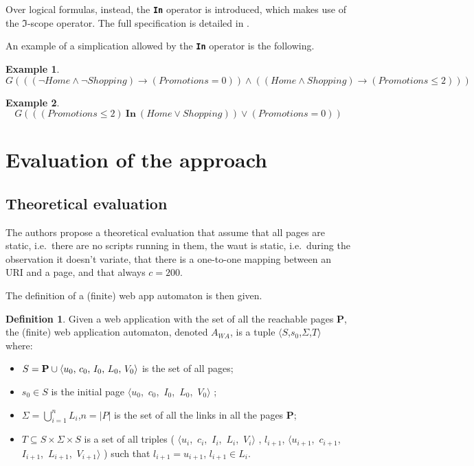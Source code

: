 \documentclass[a4paper,10pt]{article}
\newcommand{\tuple}[1]{\mbox{$\langle$#1$\rangle$}}
\newcommand{\res}[1][]{
  \ifthenelse{\equal{#1}{}}{\mbox{$\langle u$, $c$, $I$, $L$, $V\rangle$}}
  {\mbox{$\langle u_{#1}$, $c_{#1}$, $I_{#1}$, $L_{#1}$, $V_{#1}\rangle$}}
}
\theoremstyle{plain} %
\theoremstyle{definition}
\newtheorem{example}{Example}
\newtheorem{definition}{Definition}
\theoremstyle{remark}
\begin{document}
Over logical formulas, instead, the \textbf{\texttt{In}} operator is introduced, which makes use of the $\mathcal{\Im}$-scope operator. The full specification is detailed in \cite{Haydar2005}.

An example of a simplication allowed by the \textbf{\texttt{In}} operator is the following.

\begin{example}
  $$
  G(((\neg Home\land\neg Shopping) \rightarrow (Promotions = 0))\land ((Home\land Shopping) \rightarrow (Promotions \leq 2)))
  $$
\end{example}

\begin{example}
  \label{example:in-operator-simple}
  $$
  G(((Promotions \leq 2)\ \textbf{In}\ (Home\lor Shopping))\lor(Promotions=0))
  $$
\end{example}

\section{Evaluation of the approach}

\subsection{Theoretical evaluation}

The authors propose a theoretical evaluation that assume that all pages are static, i.e.\ there are no scripts running in them, the \gls{waut} is static, i.e.\ during the observation it doesn't variate, that there is a one-to-one mapping between an URI and a page, and that always $c = 200$.

The definition of a (finite) web app automaton is then given.

\begin{definition}
  Given a web application with the set of all the reachable pages \textbf{P}, the (finite) web application automaton, denoted $A_{WA}$, is a tuple \tuple{$S$,$s_0$,$\Sigma$,$T$} where:

  \begin{itemize}
    \item $S = \textbf{P}\cup\res[0]$ is the set of all pages;
    \item $s_0\in S$ is the initial page \res[0];
    \item $\Sigma=\bigcup_{i=1}^n L_i$,$n=|P|$ is the set of all the links in all the pages \textbf{P};
    \item $T \subseteq S \times\Sigma\times S$ is a set of all triples (\res[i], $l_{i+1}$, \res[i+1]) such that $l_{i+1} = u_{i+1}$, $l_{i+1}\in L_i$.
  \end{itemize}
\end{definition}
\end{document}
